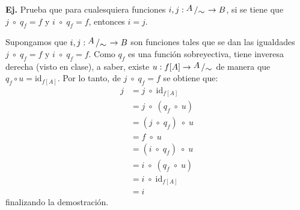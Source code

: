 \documentclass[letterpaper,DIV=14,headsepline,12pt]{scrartcl}
\makeatletter
\newcounter{Ejer}
\newcommand{\pts}{}
\newenvironment{ejercicio}[1]{\noindent
    \ifthenelse{\equal{#1}{1} \OR \equal{#1}{+1}}{\renewcommand{\pts}{\textbf{(#1 pt)}}}{\renewcommand{\pts}{\textbf{(#1 pts)}}}\textbf{Ej. \theEjer} \pts\stepcounter{Ejer}}{\vspace{.3cm}}
\newcommand{\id}{\mathrm{id}}
\newcommand{\quot}[2]{{\raisebox{.2em}{$#1$}\left/\raisebox{-.2em}{$#2$}\right.}}
\renewenvironment{proof}[1][]{%
        \par\pushQED{\qed}%
        \normalfont\topsep6pt \partopsep0pt %
        \trivlist
        \item[\hskip\labelsep
                \textbf{\textit{Demostración.}}%
        ]#1
        }{%
        \popQED\endtrivlist\@endpefalse
    }
\makeatother
\begin{document}
    \begin{ejercicio}{+1}
        Prueba que para cualesquiera funciones $i,j:\quot{A}{\sim}\to B$, si se tiene que 
        $ j \; \circ \; q_f = f$ y $ i  \; \circ \; q_f = f$, entonces $i=j$.
    \end{ejercicio}
    \begin{proof}
        Supongamos que $i,j:\quot{A}{\sim}\to B$ son funciones tales que se dan las igualdades $ j \; \circ \; q_f = f$ y $ i  \; \circ \; q_f = f$. Como $q_f$ es una función sobreyectiva, tiene inveresa derecha (visto en clase), a saber, existe $u:f[A] \to \quot{A}{\sim}$ de manera que $q_f \circ u = \id_{f[A]}$. Por lo tanto, de $ j \; \circ \; q_f = f$ se obtiene que:
        \begin{align*}
            j & = j \; \circ \; \id_{f[A]} \tag*{(La identidad es neutro de la composición)} \\
            & = j \; \circ \; ( q_f \; \circ \; u) \tag*{($u$ es inversa derecha de $q_f$)} \\
            & = (j \; \circ \; q_f) \; \circ \; u \tag*{(La composición es asociativa)} \\
            & = f \; \circ \; u \tag*{(Pues $j \; \circ \; q_f = f$)} \\
            & = (i \; \circ \; q_f) \; \circ \; u \tag*{(Pues $i \; \circ \; q_f = f$)} \\
            & = i \; \circ \; ( q_f \; \circ \; u) \tag*{(La composición es asociativa)} \\
            & = i \; \circ \; \id_{f[A]} \tag*{($u$ es inversa derecha de $q_f$)} \\
            & = i \tag*{(La identidad es neutro de la composición)} 
        \end{align*}
        finalizando la demostración.
    \end{proof}
\end{document}
